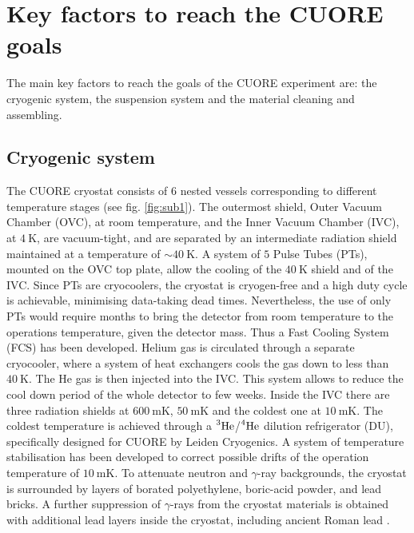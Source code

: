 \documentclass[12pt]{article}
\begin{document}

\section{Key factors to reach the CUORE goals}

The main key factors to reach the goals of the CUORE experiment are: the cryogenic system, the suspension system and the material cleaning and assembling.

\subsection{Cryogenic system}

The CUORE cryostat consists of 6 nested vessels corresponding to different temperature stages (see fig. \ref{fig:sub1}). The outermost shield, Outer Vacuum Chamber (OVC), at room temperature, and the Inner Vacuum Chamber (IVC), at $4~\mathrm{K}$, are vacuum-tight, and are separated by an intermediate radiation shield maintained at a temperature of $\sim40~\mathrm{K}$. A system of $5$ Pulse Tubes (PTs), mounted on the OVC top plate, allow the cooling of the $40~\mathrm{K}$ shield and of the IVC. Since PTs are cryocoolers, the cryostat is cryogen-free and a high duty cycle is achievable, minimising data-taking dead times. Nevertheless, the use of only PTs would require months to bring the detector from room temperature to the operations temperature, given the detector mass. Thus a Fast Cooling System (FCS) has been developed. Helium gas is circulated through a separate cryocooler, where a system of heat exchangers cools the gas down to less than $40~\mathrm{K}$. The He gas is then injected into the IVC. This system allows to reduce the cool down period of the whole detector to few weeks. Inside the IVC there are three radiation shields at $600~\mathrm{mK}$, $50~\mathrm{mK}$ and the coldest one at $10~\mathrm{mK}$. The coldest temperature is achieved through a $\prescript{3}{}{\mathrm{He}}$/$\prescript{4}{}{\mathrm{He}}$ dilution refrigerator (DU), specifically designed for CUORE by Leiden Cryogenics. A system of temperature stabilisation has been developed to correct possible drifts of the operation temperature of $10~\mathrm{mK}$. To attenuate neutron and $\gamma$-ray backgrounds, the cryostat is surrounded by layers of borated polyethylene, boric-acid powder, and lead bricks. A further suppression of $\gamma$-rays from the cryostat materials is obtained with additional lead layers inside the cryostat, including ancient Roman lead \cite{romanpb}.
\end{document}
